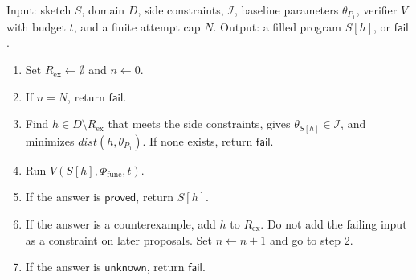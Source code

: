 \begin{algo}
\label{alg:cegis}
Input: sketch \(S\), domain \(D\), side constraints, \(\mathcal{I}\),
baseline parameters \(\theta_{P_1}\), verifier \(V\) with budget \(t\), and
a finite attempt cap \(N\).
Output: a filled program \(S[h]\), or \(\mathsf{fail}\).
\begin{enumerate}
  \item Set \(R_{\mathrm{ex}} \gets \emptyset\) and \(n \gets 0\).
  \item If \(n = N\), return \(\mathsf{fail}\).
  \item Find \(h \in D \setminus R_{\mathrm{ex}}\) that meets the side
  constraints, gives \(\theta_{S[h]} \in \mathcal{I}\), and minimizes
  \(\mathit{dist}(h, \theta_{P_1})\). If none exists, return
  \(\mathsf{fail}\).
  \item Run \(V(S[h], \Phi_{\text{func}}, t)\).
  \item If the answer is \(\mathsf{proved}\), return \(S[h]\).
  \item If the answer is a counterexample, add \(h\) to
  \(R_{\mathrm{ex}}\). Do not add the failing input as a constraint on
  later proposals. Set \(n \gets n+1\) and go to step 2.
  \item If the answer is \(\mathsf{unknown}\), return \(\mathsf{fail}\).
\end{enumerate}
\end{algo}


